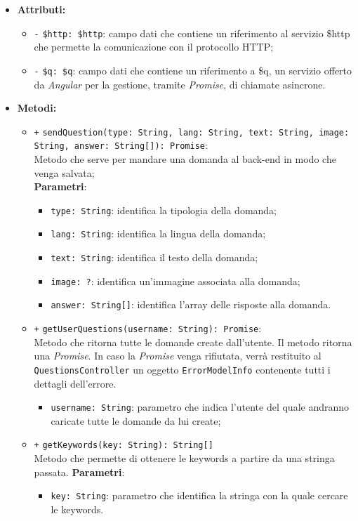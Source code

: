 \begin{itemize}
\begin{itemize}
	\end{itemize}
	\item \textbf{Attributi:}
	\begin{itemize}
		\item \texttt{-} \texttt{\$http: \$http}: campo dati che contiene un riferimento al servizio \$http che permette la comunicazione con il protocollo HTTP;
		\item \texttt{-} \texttt{\$q: \$q}: campo dati che contiene un riferimento a \$q, un servizio offerto da \textit{Angular} per la gestione, tramite \textit{Promise}, di chiamate asincrone.
	\end{itemize}
	\item \textbf{Metodi:}
	\begin{itemize}
		\item \texttt{+} \texttt{sendQuestion(type: String, lang: String, text: String, image: String, answer: String[]): Promise}: \\Metodo che serve per mandare una domanda al back-end in modo che venga salvata;\\ 
		\textbf{Parametri}: 
		\begin{itemize}
			\item \texttt{type: String}: identifica la tipologia della domanda;
			\item \texttt{lang: String}: identifica la lingua della domanda;
			\item \texttt{text: String}: identifica il testo della domanda;
			\item \texttt{image: ?}: identifica un'immagine associata alla domanda;
			\item \texttt{answer: String[]}: identifica l'array delle risposte alla domanda.
		\end{itemize}
		\item \texttt{+} \texttt{getUserQuestions(username: String): Promise}: \\Metodo che ritorna tutte le domande create dall'utente. Il metodo ritorna una \textit{Promise}. In caso la \textit{Promise} venga rifiutata, verrà restituito al \texttt{QuestionsController} un oggetto \texttt{ErrorModelInfo} contenente tutti i dettagli dell'errore. \\
		\begin{itemize}
			\item \texttt{username: String}: parametro che indica l'utente del quale andranno caricate tutte le domande da lui create;
		\end{itemize}
		\item \texttt{+} \texttt{getKeywords(key: String): String[]}\\ Metodo che permette di ottenere le keywords a partire da una stringa passata.
		\textbf{Parametri}:
		\begin{itemize}
			\item \texttt{key: String}: parametro che identifica la stringa con la quale cercare le keywords.
		\end{itemize} 
	\end{itemize}
\end{itemize}

